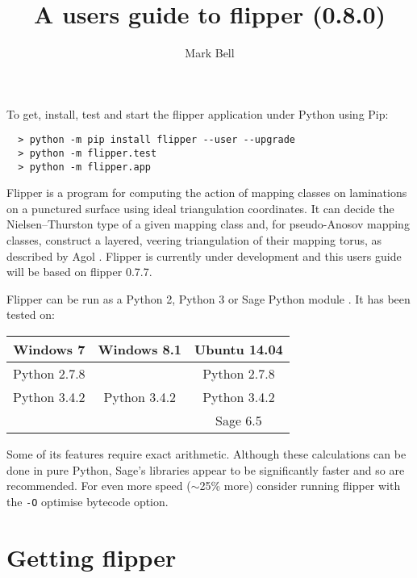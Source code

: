 \documentclass[a4paper]{article}
\title{A users guide to flipper (0.8.0)}
\author{Mark Bell}
\begin{document}
\maketitle

\begin{center}
\begin{minipage}{0.8\linewidth}
\begin{framed}
  To get, install, test and start the flipper application under Python using Pip:
  \begin{lstlisting}
  > python -m pip install flipper --user --upgrade
  > python -m flipper.test
  > python -m flipper.app
  \end{lstlisting}
\end{framed}
\end{minipage}
\end{center}

Flipper is a program for computing the action of mapping classes on laminations on a punctured surface using ideal triangulation coordinates. It can decide the Nielsen--Thurston type of a given mapping class and, for pseudo-Anosov mapping classes, construct a layered, veering triangulation of their mapping torus, as described by Agol \cite{Agol}. Flipper is currently under development and this users guide will be based on flipper 0.7.7.

Flipper can be run as a Python 2, Python 3 or Sage Python module \cite{sage}. It has been tested on:

\begin{center}
\begin{tabular}{c|c|c}
Windows 7 & Windows 8.1 & Ubuntu 14.04 \\
\hline
Python 2.7.8 & & Python 2.7.8 \\
Python 3.4.2 & Python 3.4.2 & Python 3.4.2 \\
 & & Sage 6.5 \\
\end{tabular}
\end{center}

Some of its features require exact arithmetic. Although these calculations can be done in pure Python, Sage's libraries appear to be significantly faster and so are recommended. For even more speed ($\sim$25\% more) consider running flipper with the \texttt{-O} optimise bytecode option.

\section{Getting flipper}
\end{document}
